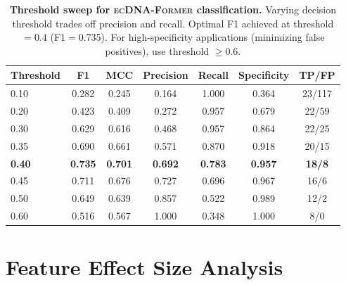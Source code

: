 \documentclass{article}
\newcommand{\former}{\textsc{ecDNA-Former}}
\begin{document}
\begin{table}[h]
\caption{\textbf{Threshold sweep for \former{} classification.} Varying decision threshold trades off precision and recall. Optimal F1 achieved at threshold $=0.4$ (F1$=$0.735). For high-specificity applications (minimizing false positives), use threshold $\geq 0.6$.}
\label{tab:threshold_app}
\centering
\small
\begin{tabular}{@{}lcccccc@{}}
\toprule
Threshold & F1 & MCC & Precision & Recall & Specificity & TP/FP \\
\midrule
0.10 & 0.282 & 0.245 & 0.164 & 1.000 & 0.364 & 23/117 \\
0.20 & 0.423 & 0.409 & 0.272 & 0.957 & 0.679 & 22/59 \\
0.30 & 0.629 & 0.616 & 0.468 & 0.957 & 0.864 & 22/25 \\
0.35 & 0.690 & 0.661 & 0.571 & 0.870 & 0.918 & 20/15 \\
\textbf{0.40} & \textbf{0.735} & \textbf{0.701} & \textbf{0.692} & \textbf{0.783} & \textbf{0.957} & \textbf{18/8} \\
0.45 & 0.711 & 0.676 & 0.727 & 0.696 & 0.967 & 16/6 \\
0.50 & 0.649 & 0.639 & 0.857 & 0.522 & 0.989 & 12/2 \\
0.60 & 0.516 & 0.567 & 1.000 & 0.348 & 1.000 & 8/0 \\
\bottomrule
\end{tabular}
\end{table}


\section{Feature Effect Size Analysis}
\label{app:features_effects}
\end{document}
